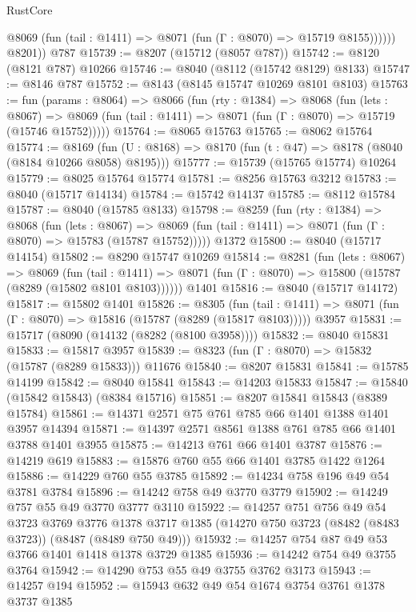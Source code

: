 \begin{lexlean}{RustCore}
\begin{coremodule}
              @8069 (fun (tail : @1411) => @8071 (fun (Γ : @8070) => @15719 @8155))))))
        @8201))
    @787
@15739 := @8207 (@15712 (@8057 @787))
@15742 := @8120 (@8121 @787) @10266
@15746 := @8040 (@8112 (@15742 @8129) @8133)
@15747 := @8146 @787
@15752 := @8143 (@8145 @15747 @10269 @8101 @8103)
@15763 := fun (params : @8064) =>
  @8066
    (fun (rty : @1384) =>
    @8068
      (fun (lets : @8067) =>
      @8069 (fun (tail : @1411) => @8071 (fun (Γ : @8070) => @15719 (@15746 @15752)))))
@15764 := @8065 @15763
@15765 := @8062 @15764
@15774 := @8169
    (fun (U : @8168) => @8170 (fun (t : @47) => @8178 (@8040 (@8184 @10266 @8058) @8195)))
@15777 := @15739 (@15765 @15774) @10264
@15779 := @8025 @15764 @15774
@15781 := @8256 @15763 @3212
@15783 := @8040 (@15717 @14134)
@15784 := @15742 @14137
@15785 := @8112 @15784
@15787 := @8040 (@15785 @8133)
@15798 := @8259
    (fun (rty : @1384) =>
    @8068
      (fun (lets : @8067) =>
      @8069 (fun (tail : @1411) => @8071 (fun (Γ : @8070) => @15783 (@15787 @15752)))))
    @1372
@15800 := @8040 (@15717 @14154)
@15802 := @8290 @15747 @10269
@15814 := @8281
    (fun (lets : @8067) =>
    @8069
      (fun (tail : @1411) =>
      @8071 (fun (Γ : @8070) => @15800 (@15787 (@8289 (@15802 @8101 @8103))))))
    @1401
@15816 := @8040 (@15717 @14172)
@15817 := @15802 @1401
@15826 := @8305
    (fun (tail : @1411) => @8071 (fun (Γ : @8070) => @15816 (@15787 (@8289 (@15817 @8103)))))
    @3957
@15831 := @15717 (@8090 (@14132 (@8282 (@8100 @3958))))
@15832 := @8040 @15831
@15833 := @15817 @3957
@15839 := @8323 (fun (Γ : @8070) => @15832 (@15787 (@8289 @15833))) @11676
@15840 := @8207 @15831
@15841 := @15785 @14199
@15842 := @8040 @15841
@15843 := @14203 @15833
@15847 := @15840 (@15842 @15843) (@8384 @15716)
@15851 := @8207 @15841 @15843 (@8389 @15784)
@15861 := @14371 @2571 @75 @761 @785 @66 @1401 @1388 @1401 @3957 @14394
@15871 := @14397 @2571 @8561 @1388 @761 @785 @66 @1401 @3788 @1401 @3955
@15875 := @14213 @761 @66 @1401 @3787
@15876 := @14219 @619
@15883 := @15876 @760 @55 @66 @1401 @3785 @1422 @1264
@15886 := @14229 @760 @55 @3785
@15892 := @14234 @758 @196 @49 @54 @3781 @3784
@15896 := @14242 @758 @49 @3770 @3779
@15902 := @14249 @757 @55 @49 @3770 @3777 @3110
@15922 := @14257
    @751
    @756
    @49
    @54
    @3723
    @3769
    @3776
    @1378
    @3717
    @1385
    (@14270 @750 @3723 (@8482 (@8483 @3723)) (@8487 (@8489 @750 @49)))
@15932 := @14257 @754 @87 @49 @53 @3766 @1401 @1418 @1378 @3729 @1385
@15936 := @14242 @754 @49 @3755 @3764
@15942 := @14290 @753 @55 @49 @3755 @3762 @3173
@15943 := @14257 @194
@15952 := @15943 @632 @49 @54 @1674 @3754 @3761 @1378 @3737 @1385

\end{coremodule}
\end{lexlean}
